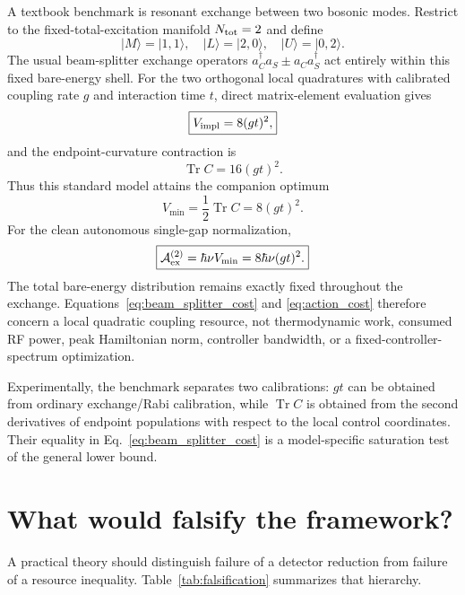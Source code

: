 \documentclass[aps,pra,reprint,superscriptaddress,longbibliography]{revtex4-2}
\newcommand{\Tr}{\operatorname{Tr}}
\newcommand{\Aex}{\mathcal A_{\rm ex}^{(2)}}
\begin{document}
A textbook benchmark is resonant exchange between two bosonic modes. Restrict to the fixed-total-excitation manifold $N_{\rm tot}=2$ and define
\begin{equation}
|M\rangle=|1,1\rangle,
\quad |L\rangle=|2,0\rangle,
\quad |U\rangle=|0,2\rangle.
\end{equation}
The usual beam-splitter exchange operators $a_C^\dagger a_S\pm a_Ca_S^\dagger$ act entirely within this fixed bare-energy shell. For the two orthogonal local quadratures with calibrated coupling rate $g$ and interaction time $t$, direct matrix-element evaluation gives
\begin{equation}
\boxed{
V_{\rm impl}=8(gt)^2,}
\end{equation}
and the endpoint-curvature contraction is
\begin{equation}
\boxed{\Tr C=16(gt)^2.}
\end{equation}
Thus this standard model attains the companion optimum
\begin{equation}
\boxed{
V_{\min}=\frac12\Tr C=8(gt)^2.}
\label{eq:beam_splitter_cost}
\end{equation}
For the clean autonomous single-gap normalization,
\begin{equation}
\boxed{
\Aex=\hbar\nu V_{\min}=8\hbar\nu(gt)^2.}
\label{eq:action_cost}
\end{equation}
The total bare-energy distribution remains exactly fixed throughout the exchange. Equations~\eqref{eq:beam_splitter_cost} and \eqref{eq:action_cost} therefore concern a local quadratic coupling resource, not thermodynamic work, consumed RF power, peak Hamiltonian norm, controller bandwidth, or a fixed-controller-spectrum optimization.

Experimentally, the benchmark separates two calibrations: $gt$ can be obtained from ordinary exchange/Rabi calibration, while $\Tr C$ is obtained from the second derivatives of endpoint populations with respect to the local control coordinates. Their equality in Eq.~\eqref{eq:beam_splitter_cost} is a model-specific saturation test of the general lower bound.

\section{What would falsify the framework?}

A practical theory should distinguish failure of a detector reduction from failure of a resource inequality. Table~\ref{tab:falsification} summarizes that hierarchy.
\end{document}
